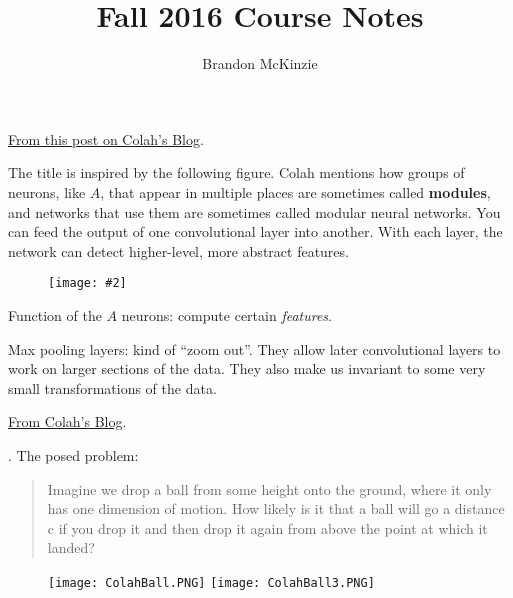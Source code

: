\documentclass[12pt]{article}
\title{\vspace{-10mm}\fontsize{24pt}{8pt}\selectfont\textbf{Fall 2016 Course Notes}\vspace*{-4mm}}
\author{Brandon McKinzie}
\date{}
\newcommand\myfig[2][0.3\textwidth]{\begin{figure}[h!]\centering\texttt{[image: \#2]}\end{figure}}
\newcommand{\myspace}{\vspace{2\bigskipamount}}
\newcommand\p{\Needspace{10\baselineskip} \noindent}
\begin{document}
\dosecttoc



\label{Condensed Summaries}



\p \href{https://colah.github.io/posts/2014-07-Conv-Nets-Modular/}{From this post on Colah's Blog}. 

\myspace The title is inspired by the following figure. Colah mentions how groups of neurons, like $A$, that appear in multiple places are sometimes called \textbf{modules}, and networks that use them are sometimes called modular neural networks. You can feed the output of one convolutional layer into another. With each layer, the network can detect higher-level, more abstract features.
\myfig[0.3\textwidth]{ColahConv2.PNG}
\begin{compactitem}[$\longrightarrow$]
	\item Function of the $A$ neurons: compute certain \textit{features}.
	
	 \item Max pooling layers: kind of ``zoom out''. They allow later convolutional layers to work on larger sections of the data. They also make us invariant to some very small transformations of the data.
\end{compactitem}





\p \href{https://colah.github.io/posts/2014-07-Understanding-Convolutions/}{From Colah's Blog}. 

\p {}. The posed problem:
\begin{footnotesize}
\begin{quote}
	Imagine we drop a ball from some height onto the ground, where it only has one dimension of motion. How likely is it that a ball will go a distance c if you drop it and then drop it again from above the point at which it landed?
\end{quote}
\end{footnotesize}

\begin{figure}[h!]
	\centering
	\texttt{[image: ColahBall.PNG]}
	\hspace{2cm}
	\texttt{[image: ColahBall3.PNG]}
\end{figure}
\end{document}
